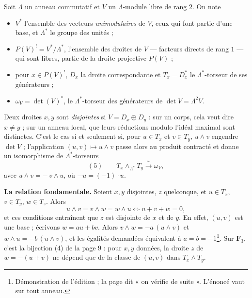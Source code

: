 \documentclass[11pt,a4paper]{article}
\begin{document}
Soit $\Lambda$ un anneau commutatif et $V$ un $\Lambda$-module libre de rang $2$.
On note
\begin{itemize}
  \item $V^{*}$ l'ensemble des vecteurs \emph{unimodulaires} de $V$, ceux qui
    font partie d'une base, et $\Lambda^{*}$ le groupe des unités ;
  \item $P(V)^{!} = V^{*}/\Lambda^{*}$, l'ensemble des droites de $V$ — facteurs
    directs de rang $1$ — qui sont libres, partie de la droite projective $P(V)$ ;
  \item pour $x \in P(V)^{!}$, $D_x$ la droite correspondante et $T_x = D_x^{*}$ le
    $\Lambda^{*}$-torseur de ses générateurs ;
  \item $\omega_V = \det(V)^{*}$, le $\Lambda^{*}$-torseur des générateurs de
    $\det V = \Lambda^2 V$.
\end{itemize}
Deux droites $x, y$ sont \emph{disjointes} si $V = D_x \oplus D_y$ : sur un corps,
cela veut dire $x \neq y$ ; sur un anneau local, que leurs réductions modulo
l'idéal maximal sont distinctes. C'est le cas si et seulement si, pour
$u \in T_x$ et $v \in T_y$, $u \wedge v$ engendre $\det V$ ; l'application
$(u, v) \mapsto u \wedge v$ passe alors au produit contracté et donne un isomorphisme
de $\Lambda^{*}$-torseurs
\[
(5) \qquad T_x \wedge_{\Lambda^{*}} T_y \xrightarrow{\ \sim\ } \omega_V ,
\]
avec $u \wedge v = -\,v \wedge u$, où $-u = (-1)\cdot u$.

\textbf{La relation fondamentale.} Soient $x, y$ disjointes, $z$ quelconque, et
$u \in T_x$, $v \in T_y$, $w \in T_z$. Alors
\[
u \wedge v = v \wedge w = w \wedge u \iff u + v + w = 0 ,
\]
et ces conditions entraînent que $z$ est disjointe de $x$ et de $y$. En effet,
$(u, v)$ est une base ; écrivons $w = au + bv$. Alors $v \wedge w = -a\,(u \wedge v)$
et $w \wedge u = -b\,(u \wedge v)$, et les égalités demandées équivalent à
$a = b = -1$\footnote{Démonstration de l'édition ; la page dit « on vérifie de
suite ». L'énoncé vaut sur tout anneau.}. Sur $\mathbf{F}_3$, c'est la
bijection (4) de la page 9 : pour $x, y$ données, la droite $z$ de $w = -(u + v)$
ne dépend que de la classe de $(u, v)$ dans $T_x \wedge T_y$.
\end{document}
